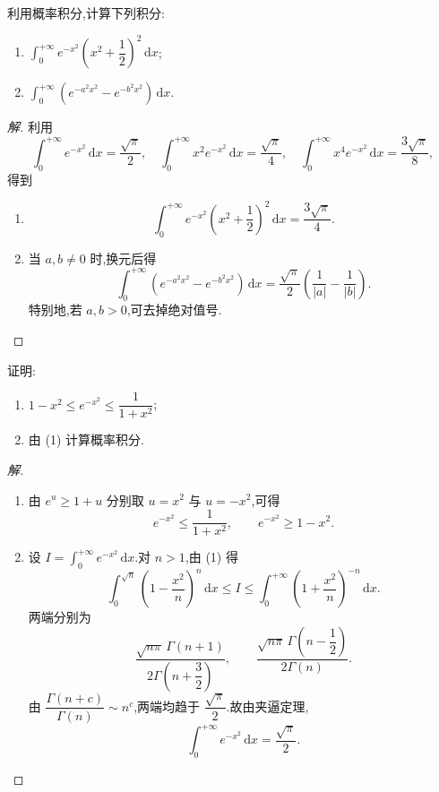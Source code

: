 \documentclass[../../数学分析培优讲义(答案版).tex]{subfiles}
\begin{document}
\begin{example}
利用概率积分,计算下列积分:
\begin{enumerate}[label=(\arabic*)]
    \item $\displaystyle\int_0^{+\infty}e^{-x^2}\left(x^2+\dfrac{1}{2}\right)^2\,\mathrm{d}x$;
    \item $\displaystyle\int_0^{+\infty}\left(e^{-a^2x^2}-e^{-b^2x^2}\right)\,\mathrm{d}x$.
\end{enumerate}
\end{example}

\begin{proof}[解]
利用
\[
    \int_0^{+\infty}e^{-x^2}\,\mathrm{d}x=\dfrac{\sqrt{\pi}}{2},
    \quad
    \int_0^{+\infty}x^2e^{-x^2}\,\mathrm{d}x=\dfrac{\sqrt{\pi}}{4},
    \quad
    \int_0^{+\infty}x^4e^{-x^2}\,\mathrm{d}x=\dfrac{3\sqrt{\pi}}{8},
\]
得到
\begin{enumerate}[label=(\arabic*)]
    \item
    \[
        \int_0^{+\infty}e^{-x^2}\left(x^2+\dfrac{1}{2}\right)^2\,\mathrm{d}x
        =\dfrac{3\sqrt{\pi}}{4}.
    \]
    \item 当 $a,b\neq0$ 时,换元后得
    \[
        \int_0^{+\infty}\left(e^{-a^2x^2}-e^{-b^2x^2}\right)\,\mathrm{d}x
        =\dfrac{\sqrt{\pi}}{2}\left(\dfrac{1}{|a|}-\dfrac{1}{|b|}\right).
    \]
    特别地,若 $a,b>0$,可去掉绝对值号.
\end{enumerate}
\end{proof}

\begin{example}
证明:
\begin{enumerate}[label=(\arabic*)]
    \item $1-x^2\leq e^{-x^2}\leq\dfrac{1}{1+x^2}$;
    \item 由 (1) 计算概率积分.
\end{enumerate}
\end{example}

\begin{proof}[解]
\begin{enumerate}[label=(\arabic*)]
    \item 由 $e^u\geq1+u$ 分别取 $u=x^2$ 与 $u=-x^2$,可得
    \[
        e^{-x^2}\leq\dfrac{1}{1+x^2},
        \qquad
        e^{-x^2}\geq1-x^2.
    \]

    \item 设 $I=\displaystyle\int_0^{+\infty}e^{-x^2}\,\mathrm{d}x$.对 $n>1$,由 (1) 得
    \[
        \int_0^{\sqrt n}\left(1-\dfrac{x^2}{n}\right)^n\,\mathrm{d}x
        \leq I\leq
        \int_0^{+\infty}\left(1+\dfrac{x^2}{n}\right)^{-n}\,\mathrm{d}x.
    \]
    两端分别为
    \[
        \dfrac{\sqrt{n\pi}\,\Gamma(n+1)}{2\Gamma\left(n+\dfrac{3}{2}\right)},
        \qquad
        \dfrac{\sqrt{n\pi}\,\Gamma\left(n-\dfrac{1}{2}\right)}{2\Gamma(n)}.
    \]
    由 $\displaystyle\dfrac{\Gamma(n+c)}{\Gamma(n)}\sim n^c$,两端均趋于
    $\dfrac{\sqrt\pi}{2}$.故由夹逼定理,
    \[
        \int_0^{+\infty}e^{-x^2}\,\mathrm{d}x=\dfrac{\sqrt\pi}{2}.
    \]
\end{enumerate}
\end{proof}
\end{document}
